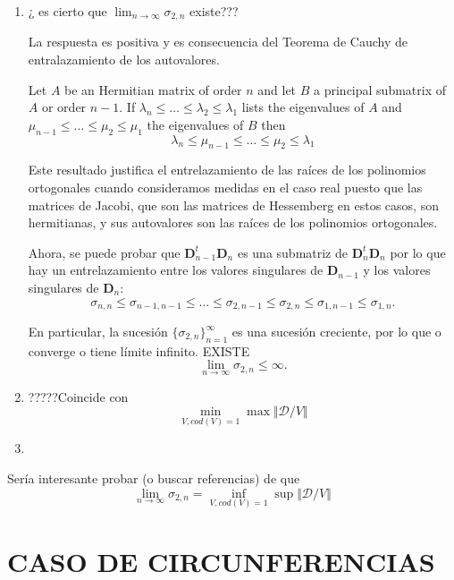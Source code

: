 \documentclass[11pt]{article}
\begin{document}
\begin{enumerate}
  \item ¿ es cierto que $\lim_{n\to \infty} \sigma_{2,n}$ existe???

        \noindent La respuesta es positiva y es consecuencia del Teorema de Cauchy de entralazamiento de los autovalores.

         Let $A$ be an Hermitian matrix of order $n$ and let $B$ a principal submatrix of $A$ or order $n-1$. If $\lambda_n\leq \dots \leq \lambda_2\leq \lambda_1$ lists the eigenvalues of $A$ and $\mu_{n-1}\leq \dots \leq \mu_2\leq \mu_1$ the eigenvalues of $B$ then
        $$
          \lambda_n \leq \mu_{n-1} \leq \dots \leq \mu_2 \leq \lambda_1
        $$

        \noindent Este resultado justifica el entrelazamiento de las raíces de los polinomios ortogonales cuando consideramos medidas en el caso real puesto que las  matrices de Jacobi, que son las matrices de Hessemberg en estos casos, son hermitianas, y sus autovalores son las raíces de los polinomios ortogonales.

        \noindent Ahora, se puede probar que
        $\mathbf{D}^{t}_{n-1}\mathbf{D}_n$ es una submatriz de $\mathbf{D}_n^{t}\mathbf{D}_n$
        por lo que hay un entrelazamiento entre los valores singulares de $\mathbf{D}_{n-1}$ y los valores singulares de $\mathbf{D}_n$:
        $$
          \sigma_{n,n} \leq \sigma_{n-1,n-1} \leq \dots \leq \sigma_{2,n-1} \leq   \sigma_{2,n} \leq \sigma_{1,n-1} \leq \sigma_{1,n}.
        $$

        \noindent En particular, la sucesión $\{\sigma_{2,n}\}_{n=1}^{\infty}$ es una sucesión creciente, por lo que o converge o tiene límite infinito. EXISTE
        $$
          \lim_{n\to \infty} \sigma_{2,n} \leq \infty.
        $$
  \item ?????Coincide con
        $$
          \min_{V, cod(V)=1} \max \Vert \mathcal{D}/V \Vert
        $$
        \noindent

  \item
\end{enumerate}

\noindent Sería interesante probar (o buscar referencias) de que
$$
  \lim_{n\to \infty} \sigma_{2,n} = \inf_{V, cod(V)=1} \sup \Vert \mathcal{D}/V \Vert
$$



\newpage

\section{CASO DE CIRCUNFERENCIAS}
\end{document}
